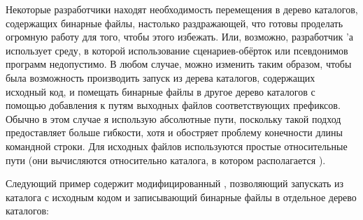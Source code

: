 Некоторые разработчики находят необходимость перемещения в дерево
каталогов, содержащих бинарные файлы, настолько раздражающей, что
готовы проделать огромную работу для того, чтобы этого избежать. Или,
возможно, разработчик \Makefile{}'а использует среду, в которой
использование сценариев\hyp{}обёрток или псевдонимов программ
недопустимо.  В любом случае, можно изменить \Makefile{} таким
образом, чтобы была возможность производить запуск \GNUmake{} из
дерева каталогов, содержащих исходный код, и помещать бинарные файлы в
другое дерево каталогов с помощью добавления к путям выходных файлов
соответствующих префиксов. Обычно в этом случае я использую абсолютные
пути, поскольку такой подход предоставляет больше гибкости, хотя и
обостряет проблему конечности длины командной строки. Для исходных
файлов используются простые относительные пути (они вычисляются
относительно каталога, в котором располагается \Makefile{}).

Следующий пример содержит модифицированный \Makefile{}, позволяющий
запускать \GNUmake{} из каталога с исходным кодом и записывающий
бинарные файлы в отдельное дерево каталогов:

